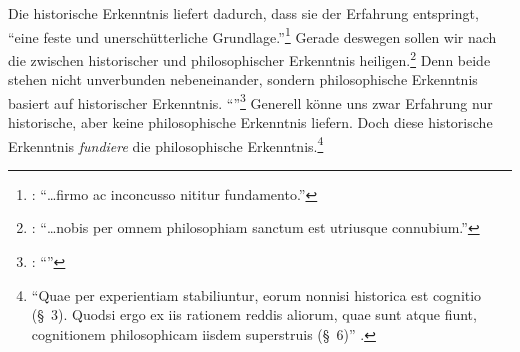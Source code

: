 Die historische Erkenntnis liefert dadurch, dass sie der Erfahrung
entspringt, \enquote{eine feste und unerschütterliche
Grundlage.}\footnote{\cite[][\S~11]{Wolff:Discursuspraeliminarisdephilosophiaingenere1996}:
\enquote{\dots\unkern firmo ac inconcusso nititur fundamento.}} Gerade deswegen
sollen wir nach  die 
zwischen historischer und philosophischer Erkenntnis
heiligen.\footnote{\cite[Vgl.][\S~12]{Wolff:Discursuspraeliminarisdephilosophiaingenere1996}:
\enquote{\dots\unkern{}nobis per omnem philosophiam sanctum est utriusque
connubium.}} Denn beide stehen nicht unverbunden nebeneinander, sondern
philosophische Erkenntnis basiert auf historischer Erkenntnis.
\enquote{}\footnote{\Cite[][\S~10]{Wolff:Discursuspraeliminarisdephilosophiaingenere1996}:
\enquote{}}  Generell könne uns zwar Erfahrung nur
historische, aber keine philosophische Erkenntnis liefern. Doch diese
historische Erkenntnis \emph{fundiere} die philosophische
Erkenntnis.\footnote{\enquote{Quae per experientiam stabiliuntur, eorum nonnisi historica est
cognitio (\S~3). Quodsi ergo ex iis rationem reddis aliorum, quae sunt atque
fiunt, cognitionem philosophicam iisdem superstruis (\S~6)}
\parencite[][\S~10]{Wolff:Discursuspraeliminarisdephilosophiaingenere1996}.}


